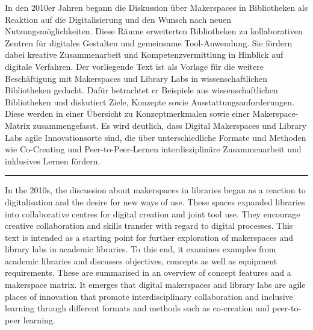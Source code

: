 In den 2010er Jahren begann die Diskussion über Makerspaces in
Bibliotheken als Reaktion auf die Digitalisierung und den Wunsch nach
neuen Nutzungsmöglichkeiten. Diese Räume erweiterten Bibliotheken zu
kollaborativen Zentren für digitales Gestalten und gemeinsame
Tool-Anwendung. Sie fördern dabei kreative Zusammenarbeit und
Kompetenzvermittlung in Hinblick auf digitale Verfahren. Der vorliegende
Text ist als Vorlage für die weitere Beschäftigung mit Makerspaces und
Library Labs in wissenschaftlichen Bibliotheken gedacht. Dafür
betrachtet er Beispiele aus wissenschaftlichen Bibliotheken und
diskutiert Ziele, Konzepte sowie Ausstattungsanforderungen. Diese werden
in einer Übersicht zu Konzeptmerkmalen sowie einer Makerspace-Matrix
zusammengefasst. Es wird deutlich, dass Digital Makerspaces und Library
Labs agile Innovationsorte sind, die über unterschiedliche Formate und
Methoden wie Co-Creating und Peer-to-Peer-Lernen interdisziplinäre
Zusammenarbeit und inklusives Lernen fördern.

\begin{center}\rule{0.5\linewidth}{0.5pt}\end{center}

In the 2010s, the discussion about makerspaces in libraries began as a
reaction to digitalisation and the desire for new ways of use. These
spaces expanded libraries into collaborative centres for digital
creation and joint tool use. They encourage creative collaboration and
skills transfer with regard to digital processes. This text is intended
as a starting point for further exploration of makerspaces and library
labs in academic libraries. To this end, it examines examples from
academic libraries and discusses objectives, concepts as well as
equipment requirements. These are summarised in an overview of concept
features and a makerspace matrix. It emerges that digital makerspaces
and library labs are agile places of innovation that promote
interdisciplinary collaboration and inclusive learning through different
formats and methods such as co-creation and peer-to-peer learning.

